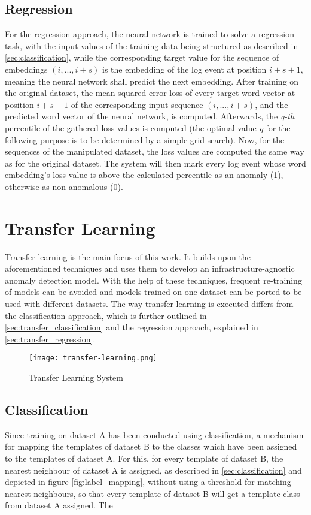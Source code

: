 \subsection{Regression \label{sec:regression}}
For the regression approach, the neural network is trained to solve a regression task, with the input values of the training data being structured as described in \ref{sec:classification}, while the corresponding target value for the sequence of embeddings $(i, ..., i+s)$ is the embedding of the log event at position $i+s+1$, meaning the neural network shall predict the next embedding. After training on the original dataset, the mean squared error loss of every target word vector at position $i+s+1$ of the corresponding input sequence $(i, ..., i+s)$, and the predicted word vector of the neural network, is computed. Afterwards, the \textit{q-th} percentile of the gathered loss values is computed (the optimal value \textit{q} for the following purpose is to be determined by a simple grid-search). Now, for the sequences of the manipulated dataset, the loss values are computed the same way as for the original dataset. The system will then mark every log event whose word embedding's loss value is above the calculated percentile as an anomaly (1), otherwise as non anomalous (0). 



\section{Transfer Learning \label{sec:transferlearning}}
Transfer learning is the main focus of this work. It builds upon the aforementioned techniques and uses them to develop an infrastructure-agnostic anomaly detection model. With the help of these techniques, frequent re-training of models can be avoided and models trained on one dataset can be ported to be used with different datasets. The way transfer learning is executed differs from the classification approach, which is further outlined in \ref{sec:transfer_classification} and the regression approach, explained in \ref{sec:transfer_regression}. 

\begin{figure}[H]
	\centering
	\texttt{[image: transfer-learning.png]}
	\caption{Transfer Learning System}
	\label{fig:transfer_learning_system}
\end{figure}

\subsection{Classification \label{sec:transfer_classification}}
Since training on dataset A has been conducted using classification, a mechanism for mapping the templates of dataset B to the classes which have been assigned to the templates of dataset A. For this, for every template of dataset B, the nearest neighbour of dataset A is assigned, as described in \ref{sec:classification} and depicted in figure \ref{fig:label_mapping}, without using a threshold for matching nearest neighbours, so that every template of dataset B will get a template class from dataset A assigned. The 


